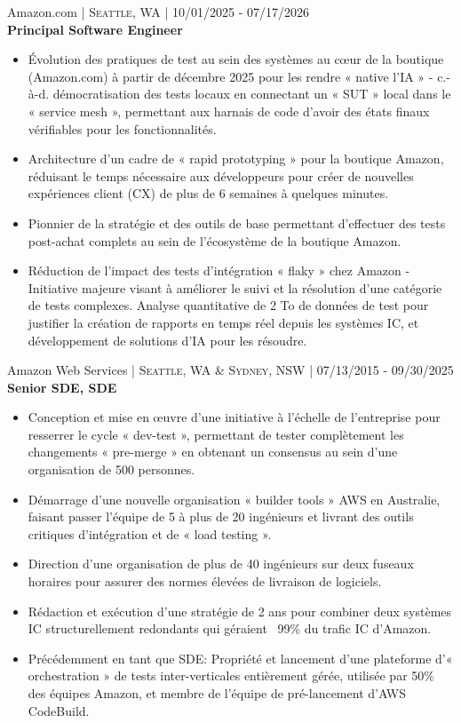 \documentclass[10pt]{article} %
\begin{document}
{\raggedright\large Amazon.com \normalsize\textsc{ | Seattle, WA} | 10/01/2025 - 07/17/2026\\
\textbf{Principal Software Engineer}\\[2pt]}
\begin{itemize}\itemsep-0.5em
    \item Évolution des pratiques de test au sein des systèmes au cœur de la boutique (Amazon.com) à partir de décembre 2025 pour les rendre « native l'IA » - c.-à-d. démocratisation des tests locaux en connectant un « SUT » local dans le « service mesh », permettant aux harnais de code d'avoir des états finaux vérifiables pour les fonctionnalités.
    \item Architecture d'un cadre de « rapid prototyping » pour la boutique Amazon, réduisant le temps nécessaire aux développeurs pour créer de nouvelles expériences client (CX) de plus de 6 semaines à quelques minutes.
    \item Pionnier de la stratégie et des outils de base permettant d'effectuer des tests post-achat complets au sein de l'écosystème de la boutique Amazon.
    \item Réduction de l'impact des tests d'intégration « flaky » chez Amazon - Initiative majeure visant à améliorer le suivi et la résolution d'une catégorie de tests complexes. Analyse quantitative de 2 To de données de test pour justifier la création de rapports en temps réel depuis les systèmes IC, et développement de solutions d'IA pour les résoudre.
\end{itemize}

{\raggedright\large Amazon Web Services \normalsize\textsc{ | Seattle, WA \& Sydney, NSW} | 07/13/2015 - 09/30/2025\\
\textbf{Senior SDE, SDE}\\[2pt]}
\begin{itemize}\itemsep-0.5em
    \item Conception et mise en œuvre d'une initiative à l'échelle de l'entreprise pour resserrer le cycle « dev-test », permettant de tester complètement les changements « pre-merge » en obtenant un consensus au sein d'une organisation de 500 personnes.
    \item Démarrage d'une nouvelle organisation « builder tools » AWS en Australie, faisant passer l'équipe de 5 à plus de 20 ingénieurs et livrant des outils critiques d'intégration et de « load testing ».
    \item Direction d'une organisation de plus de 40 ingénieurs sur deux fuseaux horaires pour assurer des normes élevées de livraison de logiciels.
    \item Rédaction et exécution d'une stratégie de 2 ans pour combiner deux systèmes IC structurellement redondants qui géraient ~99\% du trafic IC d'Amazon.
    \item Précédemment en tant que SDE: Propriété et lancement d'une plateforme d'« orchestration » de tests inter-verticales entièrement gérée, utilisée par 50\% des équipes Amazon, et membre de l'équipe de pré-lancement d'AWS CodeBuild.
\end{itemize}
\end{document}
